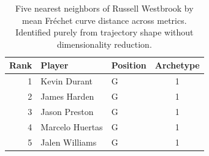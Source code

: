\begin{table}[htbp]
  \centering\small
  \begin{tabular}{rllc}
    \toprule
    Rank & Player & Position & Archetype \\
    \midrule
    1 & Kevin Durant & G & 1 \\
    2 & James Harden & G & 1 \\
    3 & Jason Preston & G & 1 \\
    4 & Marcelo Huertas & G & 1 \\
    5 & Jalen Williams & G & 1 \\
    \bottomrule
  \end{tabular}
  \caption{Five nearest neighbors of Russell Westbrook by mean Fr\'{e}chet curve distance across metrics. Identified purely from trajectory shape without dimensionality reduction.}
  \label{tab:Russell_Westbrook_frechet_curve_neighbors}
\end{table}

